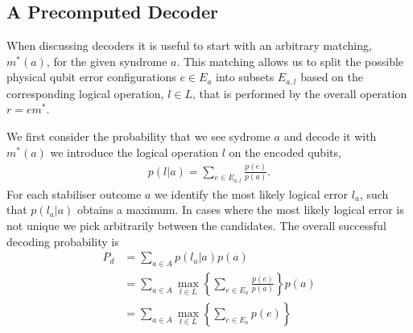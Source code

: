 \subsection{A Precomputed Decoder}

When discussing decoders it is useful to start with an arbitrary matching, $m^*(a)$, for the given syndrome $a$. This matching allows us to split the possible physical qubit error configurations $e \in E_a$ into subsets $E_{a,l}$ based on the corresponding logical operation, $l\in L$, that is performed by the overall operation $r = em^*$.

We first consider the probability that we see sydrome $a$ and decode it with $m^*(a)$ we introduce the logical operation $l$ on the encoded qubits,
\begin{align}
  p(l \vert a) = \sum_{e \in E_{a,l}} \frac{p(e)}{p(a)}. 
\end{align}
For each stabiliser outcome $a$ we identify the most likely logical error $l_a$, such that $p(l_a \vert a)$ obtains a maximum. In cases where the most likely logical error is not unique we pick arbitrarily between the candidates. The overall successful decoding probability is 
\begin{align}
  P_d &= \sum_{a \in A} p(l_a \vert a)p(a) \\
  &= \sum_{a \in A} \max_{l\in L} \left\{ \sum_{e \in E_a} \frac{p(e)}{p(a)} \right\} p(a) \\
  &= \sum_{a \in A} \max_{l\in L} \left\{ \sum_{e \in E_a} p(e) \right\} \label{truthful_prob}
\end{align}

